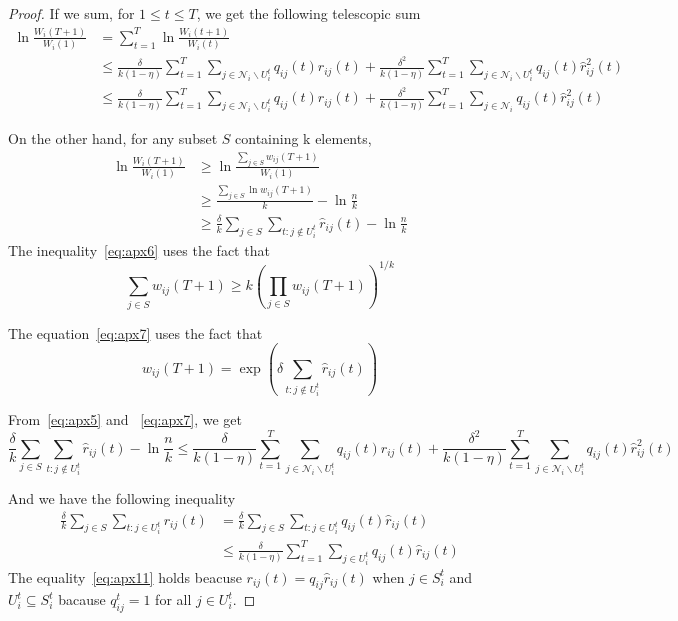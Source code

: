 \documentclass{article}
\begin{document}
\begin{proof}
If we sum, for $1\leq t\leq T$, we get the following telescopic sum
{\footnotesize
\begin{align}
	\ln\frac{W_i(T+1)}{W_i(1)} &= \sum_{t=1}^{T}\ln\frac{W_i(t+1)}{W_i(t)} \\
	&\leq \frac{\delta}{k(1-\eta)}\sum_{t=1}^T\sum_{j\in\mathcal{N}_i\backslash U_i^t}q_{ij}(t)\hat{r}_{ij}(t) + \frac{\delta^2}{k(1-\eta)}\sum_{t=1}^T\sum_{j\in\mathcal{N}_i\backslash U_i^t}q_{ij}(t)\hat{r}_{ij}^2(t) \\
	&\leq \frac{\delta}{k(1-\eta)}\sum_{t=1}^T\sum_{j\in\mathcal{N}_i\backslash U_i^t}q_{ij}(t)\hat{r}_{ij}(t) + \frac{\delta^2}{k(1-\eta)}\sum_{t=1}^T\sum_{j\in\mathcal{N}_i}q_{ij}(t)\hat{r}_{ij}^2(t) \label{eq:apx5}
\end{align}
}

On the other hand, for any subset $S$ containing k elements,
{\footnotesize
\begin{align}
	\ln\frac{W_i(T+1)}{W_i(1)}&\geq \ln\frac{\sum_{j\in S}w_{ij}(T+1)}{W_i(1)} \\
	&\geq \frac{\sum_{j\in S}\ln w_{ij}(T+1)}{k} - \ln\frac{n}{k} \label{eq:apx6} \\
	&\geq \frac{\delta}{k}\sum_{j\in S}\sum_{t:j\notin U_i^t}\hat{r}_{ij}(t) - \ln\frac{n}{k} \label{eq:apx7}
\end{align}
}
The inequality~\eqref{eq:apx6} uses the fact that
{\footnotesize
\begin{equation*}
	\sum_{j\in S}w_{ij}(T+1)\geq k(\prod_{j\in S}w_{ij}(T+1))^{1/k}
\end{equation*}
}

The equation~\eqref{eq:apx7} uses the fact that
{\footnotesize
\begin{equation*}
	w_{ij}(T+1)=\exp(\delta\sum_{t:j\notin U_i^t}\hat{r}_{ij}(t))
\end{equation*}
}

From~\eqref{eq:apx5} and ~\eqref{eq:apx7}, we get
{\footnotesize
\begin{equation}
	\frac{\delta}{k}\sum_{j\in S}\sum_{t:j\notin U_i^t}\hat{r}_{ij}(t) - \ln\frac{n}{k} \leq \frac{\delta}{k(1-\eta)}\sum_{t=1}^T\sum_{j\in\mathcal{N}_i\backslash U_i^t}q_{ij}(t)\hat{r}_{ij}(t) + \frac{\delta^2}{k(1-\eta)}\sum_{t=1}^T\sum_{j\in\mathcal{N}_i\backslash U_i^t}q_{ij}(t)\hat{r}_{ij}^2(t) \label{eq:apx13}
\end{equation}
}

And we have the following inequality
{\footnotesize
\begin{align}
	\frac{\delta}{k}\sum_{j\in S}\sum_{t:j\in U_i^t}r_{ij}(t) &= \frac{\delta}{k}\sum_{j\in S}\sum_{t:j\in U_i^t}q_{ij}(t)\hat{r}_{ij}(t) \label{eq:apx11} \\
		&\leq \frac{\delta}{k(1-\eta)}\sum_{t=1}^T\sum_{j\in U_i^t}q_{ij}(t)\hat{r}_{ij}(t) \label{eq:apx12}
\end{align}
}
The equality~\eqref{eq:apx11} holds beacuse $r_{ij}(t)=q_{ij}\hat{r}_{ij}(t)$ when $j\in S_i^t$ and $U_i^t\subseteq S_i^t$ bacause $q_{ij}^t=1$ for all $j\in U_i^t$.


\end{proof}
\end{document}
